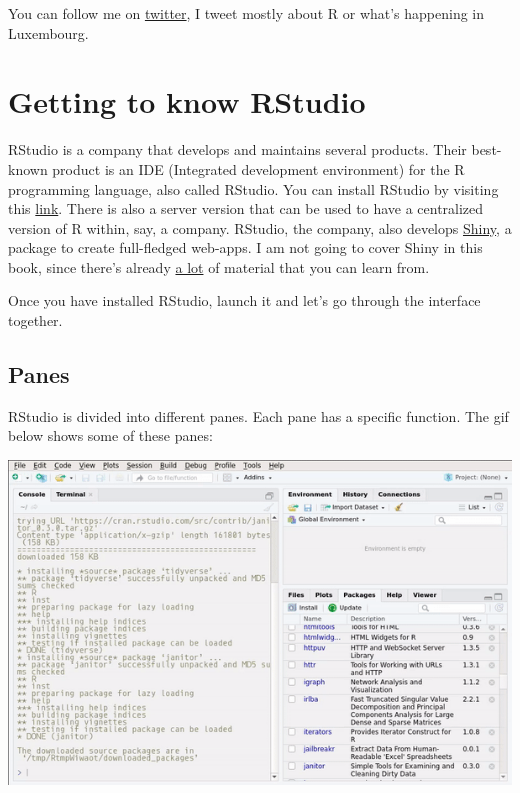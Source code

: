 \documentclass[]{gitbook}
\begin{document}
You can follow me on \href{https://www.twitter.com/brodriguesco}{twitter}, I tweet mostly about R or
what's happening in Luxembourg.

\hypertarget{getting-to-know-rstudio}{%
\section{Getting to know RStudio}\label{getting-to-know-rstudio}}

RStudio is a company that develops and maintains several products. Their best-known product is
an IDE (Integrated development environment) for the R programming language, also called RStudio.
You can install RStudio by visiting this \href{https://www.rstudio.com/products/rstudio/download/}{link}.
There is also a server version that can be used to have a centralized version of R within, say, a
company. RStudio, the company, also develops \href{https://shiny.rstudio.com/}{Shiny}, a package to
create full-fledged web-apps. I am not going to cover Shiny in this book, since there's already
\href{http://shiny.rstudio.com/tutorial/}{a lot} of material that you can learn from.

Once you have installed RStudio, launch it and let's go through the interface together.

\hypertarget{panes}{%
\subsection{Panes}\label{panes}}

RStudio is divided into different panes. Each pane has a specific function. The gif below shows
some of these panes:

\includegraphics{pics/rstudio_panes.gif}
\end{document}
